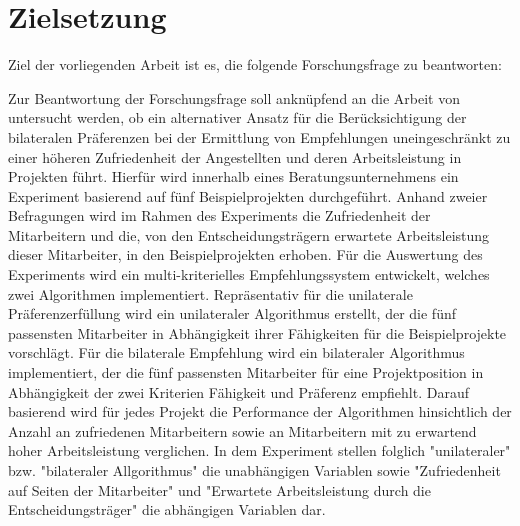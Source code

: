 \section{Zielsetzung}
\label{sec:einletung:zielsetzung}
Ziel der vorliegenden Arbeit ist es, die folgende Forschungsfrage zu beantworten:

\forschungsfrage

Zur Beantwortung der Forschungsfrage soll anknüpfend an die Arbeit von \textcite[S. 1ff.]{link:booklet} untersucht werden, ob ein alternativer Ansatz für die Berücksichtigung der bilateralen Präferenzen bei der Ermittlung von Empfehlungen uneingeschränkt zu einer höheren Zufriedenheit der Angestellten und deren Arbeitsleistung in Projekten führt.
Hierfür wird innerhalb eines Beratungsunternehmens ein Experiment basierend auf fünf Beispielprojekten durchgeführt.
Anhand zweier Befragungen wird im Rahmen des Experiments die Zufriedenheit der Mitarbeitern und die, von den Entscheidungsträgern erwartete Arbeitsleistung dieser Mitarbeiter, in den Beispielprojekten erhoben.
Für die Auswertung des Experiments wird ein multi-kriterielles Empfehlungssystem entwickelt, welches zwei Algorithmen implementiert.
Repräsentativ für die unilaterale Präferenzerfüllung wird ein unilateraler Algorithmus erstellt, der die fünf passensten Mitarbeiter in Abhängigkeit ihrer Fähigkeiten für die Beispielprojekte vorschlägt.
Für die bilaterale Empfehlung wird ein bilateraler Algorithmus implementiert, der die fünf passensten Mitarbeiter für eine Projektposition in Abhängigkeit der zwei Kriterien Fähigkeit und Präferenz empfiehlt.
Darauf basierend wird für jedes Projekt die Performance der Algorithmen hinsichtlich der Anzahl an zufriedenen Mitarbeitern sowie an Mitarbeitern mit zu erwartend hoher Arbeitsleistung verglichen.
In dem Experiment stellen folglich "unilateraler" bzw. "bilateraler Allgorithmus" die unabhängigen Variablen sowie "Zufriedenheit auf Seiten der Mitarbeiter" und "Erwartete Arbeitsleistung durch die Entscheidungsträger" die abhängigen Variablen dar.


